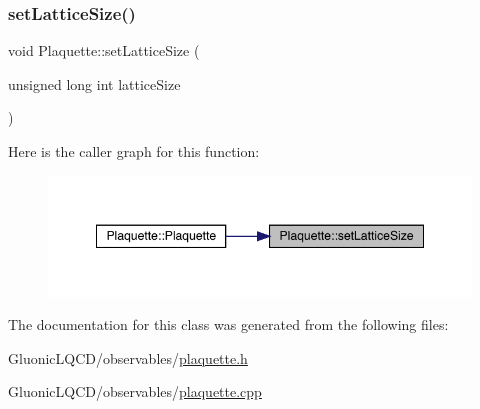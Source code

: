 \subsubsection{\texorpdfstring{setLatticeSize()}{setLatticeSize()}}
{\footnotesize\ttfamily void Plaquette\+::set\+Lattice\+Size (\begin{DoxyParamCaption}\item[{unsigned long int}]{lattice\+Size }\end{DoxyParamCaption})}

Here is the caller graph for this function\+:
\nopagebreak
\begin{figure}[H]
\begin{center}
\leavevmode
\includegraphics[width=348pt]{class_plaquette_a011e1ca450fb40273ec8efa6d094c279_icgraph}
\end{center}
\end{figure}


The documentation for this class was generated from the following files\+:\begin{DoxyCompactItemize}
\item 
Gluonic\+L\+Q\+C\+D/observables/\mbox{\hyperlink{plaquette_8h}{plaquette.\+h}}\item 
Gluonic\+L\+Q\+C\+D/observables/\mbox{\hyperlink{plaquette_8cpp}{plaquette.\+cpp}}\end{DoxyCompactItemize}
